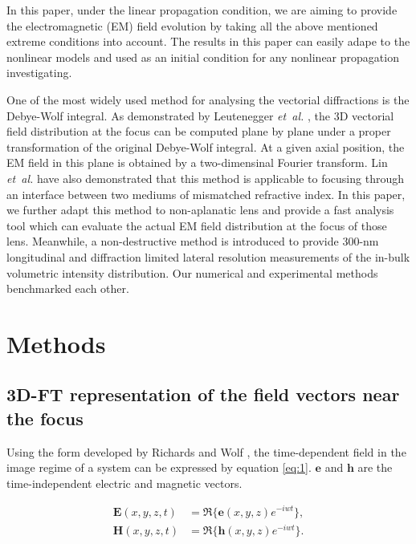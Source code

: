 \documentclass[9pt,twocolumn,twoside]{osajnl}
\begin{document}
In this paper, under the linear propagation condition, we are aiming to provide the electromagnetic (EM) field evolution by taking all the above mentioned extreme conditions into account. The results in this paper can easily adape to the nonlinear models and used as an initial condition for any nonlinear propagation investigating.  

One of the most widely used method for analysing the vectorial diffractions is the Debye-Wolf integral. As demonstrated by Leutenegger \emph{et~al.} \cite{leutenegger2006fast}, the 3D vectorial field distribution at the focus can be computed plane by plane under a proper transformation of the original Debye-Wolf integral. At a given axial position, the EM field in this plane is obtained by a two-dimensinal Fourier transform. Lin \emph{et~al.} \cite{Lin2012} have also demonstrated that this method is applicable to focusing through an interface between two mediums of mismatched refractive index. In this paper, we further adapt this method to non-aplanatic lens and provide a fast analysis tool which can evaluate the actual EM field distribution at the focus of those lens. Meanwhile, a non-destructive method is introduced to provide 300-nm longitudinal and diffraction limited lateral resolution measurements of the in-bulk volumetric intensity distribution. Our numerical and experimental methods benchmarked each other. 


\section{Methods} \label{section:2}
\subsection{3D-FT representation of the field vectors near the focus}
Using the form developed by Richards and Wolf \cite{richards1959electromagnetic}, the time-dependent field in the image regime of a system can be expressed by equation \eqref{eq:1}. $\textbf{e}$ and $\textbf{h}$ are the time-independent electric and magnetic vectors.

\begin{equation}\label{eq:1}
	\begin{aligned}
		\textbf{E}(x, y, z, t)&=\Re\{\textbf{e}(x, y, z)e^{-iwt}\},\\
		\textbf{H}(x, y, z, t)&=\Re\{\textbf{h}(x, y, z)e^{-iwt}\}.
	\end{aligned}	
\end{equation}
\end{document}

